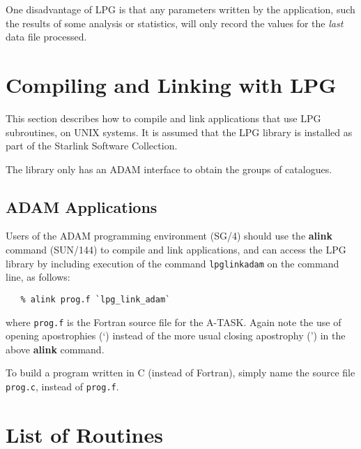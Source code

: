 \documentclass[twoside,11pt]{article}
\newenvironment{latexonly}{}{}
\newcommand{\latex}[1]{#1}
\newcommand{\xref}[3]{#1}
\renewcommand{\_}{\texttt{\symbol{95}}}
\newcommand{\latexonlysection}[1]{\section{#1}}
\newcommand{\latexonlysection}[1]{#1}
\begin{document}
One disadvantage of LPG is that any parameters written by the
application, such the results of some analysis or statistics,
will only record the values for the \emph{last} data file processed.

\section {Compiling and Linking with LPG}

This section describes how to compile and link applications that use
LPG subroutines, on UNIX systems. It is assumed that the LPG library
is installed as part of the Starlink Software Collection.

The library only has an ADAM interface to obtain the groups of
catalogues.

\subsection{\label{ss:buildingadamapplications}ADAM Applications}
Users of the \xref{ADAM}{sg4}{} programming environment
\latex{(SG/4)} should use
the \xref{{\bf alink}}{sun144}{ADAM_link_scripts} command
(\xref{SUN/144}{sun144}{}) to compile and link applications, and can
access the LPG\_ library by including execution of the command
{\tt lpg\_link\_adam} on the command line, as follows:

\small
\begin{verbatim}
   % alink prog.f `lpg_link_adam`
\end{verbatim}
\normalsize

where {\tt prog.f} is the Fortran source file for the A-TASK. Again
note the use of opening apostrophies (`) instead of the more usual
closing apostrophy (') in the above {\bf alink} command.

To build a program written in C (instead of Fortran), simply name the
source file {\tt prog.c}, instead of {\tt prog.f}.

\newpage
\appendix

\section{List of Routines}
\end{document}
